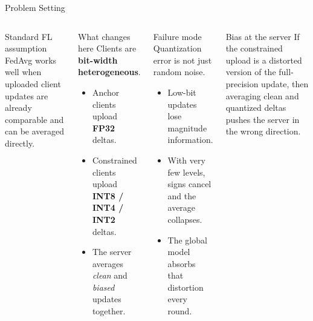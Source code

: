 \documentclass[aspectratio=169,11pt]{beamer}
\begin{document}
\begin{frame}{Problem Setting}
\small
\begin{columns}[T,totalwidth=\textwidth]
\begin{block}{Standard FL assumption}
FedAvg works well when uploaded client updates are already comparable and can
be averaged directly.
\end{block}

\vspace{0.2em}
\begin{block}{What changes here}
Clients are \textbf{bit-width heterogeneous}.
\begin{itemize}\setlength{\itemsep}{0.15em}
  \item Anchor clients upload \textbf{FP32} deltas.
  \item Constrained clients upload \textbf{INT8 / INT4 / INT2} deltas.
  \item The server averages \emph{clean} and \emph{biased} updates together.
\end{itemize}
\end{block}

\begin{block}{Failure mode}
Quantization error is not just random noise.
\begin{itemize}\setlength{\itemsep}{0.15em}
  \item Low-bit updates lose magnitude information.
  \item With very few levels, signs cancel and the average collapses.
  \item The global model absorbs that distortion every round.
\end{itemize}
\end{block}

\vspace{0.1em}
\begin{alertblock}{Bias at the server}
If the constrained upload is a distorted version of the full-precision update,
then averaging clean and quantized deltas pushes the server in the wrong
direction.
\end{alertblock}
\end{columns}
\end{frame}
\end{document}
